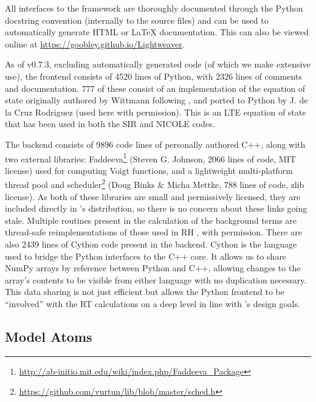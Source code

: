All interfaces to the framework are thoroughly documented through the Python docstring convention (internally to the source files) and can be used to automatically generate HTML or \LaTeX{} documentation.
This can also be viewed online at \url{https://goobley.github.io/Lightweaver}.

As of v0.7.3, excluding automatically generated code (of which we make extensive use), the \Lw{} frontend consists of 4520 lines of Python, with 2326 lines of comments and documentation.
777 of these consist of an implementation of the equation of state originally authored by Wittmann following \citet{Mihalas1978}, and ported to Python by J. de la Cruz Rodriguez (used here with permission).
This is an LTE equation of state that has been used in both the SIR \citep{1992RuizCobo} and NICOLE \citep{Socas-Navarro2015} codes.

The backend consists of 9896 code lines of personally authored C++, along with two external libraries: Faddeeva\footnote{\url{http://ab-initio.mit.edu/wiki/index.php/Faddeeva_Package}} (Steven G. Johnson, 2066 lines of code, MIT license) used for computing Voigt functions, and a lightweight multi-platform thread pool and scheduler\footnote{\url{https://github.com/vurtun/lib/blob/master/sched.h}} (Doug Binks \& Micha Mettke, 788 lines of code, zlib license).
As both of these libraries are small and permissively licensed, they are included directly in \Lw{}'s distribution, so there is no concern about these links going stale.
Multiple routines present in the calculation of the background terms are thread-safe reimplementations of those used in RH \citep{Uitenbroek2001}, with permission.
There are also 2439 lines of Cython \citep{Behnel2011} code present in the backend.
Cython is the language used to bridge the Python interfaces to the C++ core.
It allows us to share NumPy \citep{Harris2020} arrays by reference between Python and C++, allowing changes to the array's contents to be visible from either language with no duplication necessary.
This data sharing is not just efficient but allows the Python frontend to be ``involved'' with the RT calculations on a deep level in line with \Lw{}'s design goals.

\subsection{Model Atoms}

